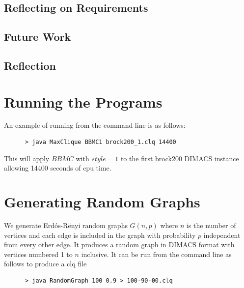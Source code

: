 \documentclass{l4proj}
\begin{document}
    \section{Reflecting on Requirements}
    
    \section{Future Work}
    
        \subsection{}
    
    \section{Reflection}
    
    

    
    

\begin{appendices}

\chapter{Running the Programs}
An example of running from the command line is as follows:
\begin{verbatim}
      > java MaxClique BBMC1 brock200_1.clq 14400
\end{verbatim}
This will apply $BBMC$ with $style = 1$ to the first brock200 DIMACS instance allowing 14400 seconds of cpu time.

\chapter{Generating Random Graphs}
\label{sec:randomGraph}
We generate Erd\'{o}s-R\"{e}nyi random graphs $G(n,p)$ where $n$ is the number of vertices and
each edge is included in the graph with probability $p$ independent from every other edge. It produces
a random graph in DIMACS format with vertices numbered 1 to $n$ inclusive. It can be run from the command line as follows to produce 
a clq file
\begin{verbatim}
      > java RandomGraph 100 0.9 > 100-90-00.clq
\end{verbatim}
\end{appendices}




\end{document}
